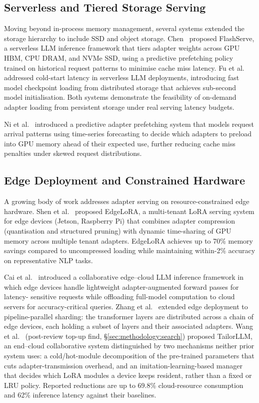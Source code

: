 \subsection{Serverless and Tiered Storage Serving}
\label{sec:inference_systems:serverless}

Moving beyond in-process memory management, several systems extended the storage
hierarchy to include SSD and object storage. Chen~\cite{ChenFlashServe2025} proposed
FlashServe, a serverless LLM inference framework that tiers adapter weights across GPU
HBM, CPU DRAM, and NVMe SSD, using a predictive prefetching policy trained on
historical request patterns to minimise cache miss latency. Fu et al.~\cite{FuServerlessLLM2024}
addressed cold-start latency in serverless LLM deployments, introducing fast model
checkpoint loading from distributed storage that achieves sub-second model initialisation.
Both systems demonstrate the feasibility of on-demand adapter loading from persistent
storage under real serving latency budgets.

Ni et al.~\cite{NiPredictive2025} introduced a predictive adapter prefetching system that models
request arrival patterns using time-series forecasting to decide which adapters to
preload into GPU memory ahead of their expected use, further reducing cache miss
penalties under skewed request distributions.

\subsection{Edge Deployment and Constrained Hardware}
\label{sec:inference_systems:edge}

A growing body of work addresses adapter serving on resource-constrained edge hardware.
Shen et al.~\cite{Shen2025EdgeLoRA} proposed EdgeLoRA, a multi-tenant LoRA serving system for edge
devices (Jetson, Raspberry Pi) that combines adapter compression (quantisation and
structured pruning) with dynamic time-sharing of GPU memory across multiple tenant
adapters. EdgeLoRA achieves up to 70\% memory savings compared to uncompressed loading
while maintaining within-2\% accuracy on representative NLP tasks.

Cai et al.~\cite{CaiEdgeLLM2024} introduced a collaborative edge--cloud LLM inference framework
in which edge devices handle lightweight adapter-augmented forward passes for latency-
sensitive requests while offloading full-model computation to cloud servers for
accuracy-critical queries. Zhang et al.~\cite{ZhangEdgeShard2025} extended edge deployment to
pipeline-parallel sharding: the transformer layers are distributed across a chain of
edge devices, each holding a subset of layers and their associated adapters.
Wang et al.~\cite{WangTailorLLM2026} (post-review top-up find,
\S\ref{sec:methodology:search}) proposed TailorLLM, an end--cloud collaborative
system distinguished by two mechanisms neither prior system uses: a
cold/hot-module decomposition of the pre-trained parameters that cuts
adapter-transmission overhead, and an imitation-learning-based manager that
decides which LoRA modules a device keeps resident, rather than a fixed or
LRU policy. Reported reductions are up to 69.8\% cloud-resource consumption
and 62\% inference latency against their baselines.


